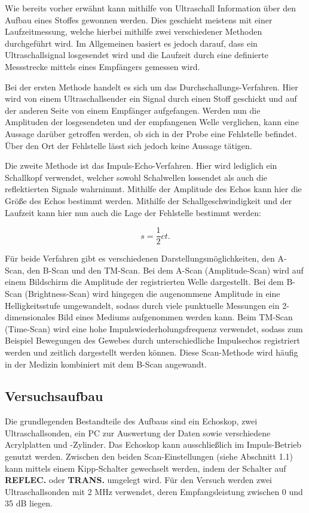Wie bereits vorher erwähnt kann mithilfe von Ultraschall Information über
den Aufbau eines Stoffes gewonnen werden. Dies geschieht meistens mit einer
Laufzeitmessung, welche hierbei mithilfe zwei verschiedener Methoden durchgeführt
wird. Im Allgemeinen basiert es jedoch darauf, dass ein Ultraschallsignal
losgesendet wird und die Laufzeit durch eine definierte Messstrecke mittels eines
Empfängers gemessen wird.

Bei der ersten Methode handelt es sich um das Durchschallungs-Verfahren. Hier
wird von einem Ultraschallsender ein Signal durch einen Stoff geschickt und auf
der anderen Seite von einem Empfänger aufgefangen. Werden nun die Amplituden der
losgesendeten und der empfangenen Welle verglichen, kann eine Aussage darüber
getroffen werden, ob sich in der Probe eine Fehlstelle befindet. Über den Ort der
Fehlstelle lässt sich jedoch keine Aussage tätigen.

Die zweite Methode ist das Impuls-Echo-Verfahren. Hier wird lediglich ein Schallkopf
verwendet, welcher sowohl Schalwellen lossendet als auch die reflektierten Signale
wahrnimmt. Mithilfe der Amplitude des Echos kann hier die Größe des Echos bestimmt
werden. Mithilfe der Schallgeschwindigkeit und der Laufzeit kann hier nun auch
die Lage der Fehlstelle bestimmt werden:

\begin{equation}
  s = \frac{1}{2} c t.
  \label{eqn:Fehlstelle}
\end{equation}

Für beide Verfahren gibt es verschiedenen Darstellungsmöglichkeiten, den A-Scan,
den B-Scan und den TM-Scan. Bei dem A-Scan (Amplitude-Scan) wird auf einem
Bildschirm die Amplitude der registrierten Welle dargestellt. Bei dem B-Scan
(Brightness-Scan) wird hingegen die augenommene Amplitude in eine Helligkeitsstufe
umgewandelt, sodass durch viele punktuelle Messungen ein 2-dimensionales Bild
eines Mediums aufgenommen werden kann. Beim TM-Scan (Time-Scan) wird eine hohe
Impulswiederholungsfrequenz verwendet, sodass zum Beispiel Bewegungen des Gewebes
durch unterschiedliche Impulsechos registriert werden und zeitlich dargestellt
werden können. Diese Scan-Methode wird häufig in der Medizin kombiniert mit dem
B-Scan angewandt.

\subsection{Versuchsaufbau}

Die grundlegenden Bestandteile des Aufbaus sind ein Echoskop, zwei Ultraschallsonden,
ein PC zur Auswertung der Daten sowie verschiedene Acrylplatten und -Zylinder.
Das Echoskop kann ausschließlich im Impuls-Betrieb genutzt werden. Zwischen den
beiden Scan-Einstellungen (siehe Abschnitt 1.1) kann mittels einem Kipp-Schalter
gewechselt werden, indem der Schalter auf \textbf{REFLEC.} oder \textbf{TRANS.}
umgelegt wird. Für den Versuch werden zwei Ultraschallsonden mit 2 MHz verwendet,
deren Empfangsleistung zwischen 0 und 35 dB liegen.

